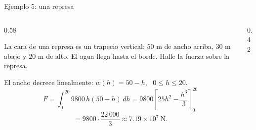 \documentclass[10pt,aspectratio=169]{beamer}
\begin{document}
\begin{frame}{Ejemplo 5: una represa}
  \begin{columns}
    \begin{column}{0.58\textwidth}
      \begin{ejemplo}
        La cara de una represa es un trapecio vertical: $50$ m de ancho arriba, $30$ m abajo y $20$ m de alto. El agua llega
        hasta el borde. Halle la fuerza sobre la represa.

        El ancho decrece linealmente: $w(h)=50-h$, \ $0\le h\le20$.
        \[ F=\int_0^{20}9800\,h(50-h)\,dh=9800\left[25h^2-\frac{h^3}3\right]_0^{20} \]
        \[ =9800\cdot\frac{22\,000}{3}\approx7.19\times10^7\ \text{N}. \]
      \end{ejemplo}
    \end{column}
    \begin{column}{0.42\textwidth}
      \centering
    \end{column}
  \end{columns}
\end{frame}
\end{document}
